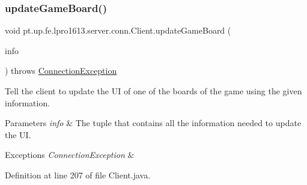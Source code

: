 \subsubsection{\texorpdfstring{update\+Game\+Board()}{updateGameBoard()}}
{\footnotesize\ttfamily void pt.\+up.\+fe.\+lpro1613.\+server.\+conn.\+Client.\+update\+Game\+Board (\begin{DoxyParamCaption}\item[{\hyperlink{classpt_1_1up_1_1fe_1_1lpro1613_1_1sharedlib_1_1structs_1_1_board_u_i_info}{Board\+U\+I\+Info}}]{info }\end{DoxyParamCaption}) throws \hyperlink{classpt_1_1up_1_1fe_1_1lpro1613_1_1sharedlib_1_1exceptions_1_1_connection_exception}{Connection\+Exception}}

Tell the client to update the UI of one of the boards of the game using the given information.


\begin{DoxyParams}{Parameters}
{\em info} & The tuple that contains all the information needed to update the UI. \\
\hline
\end{DoxyParams}

\begin{DoxyExceptions}{Exceptions}
{\em Connection\+Exception} & \\
\hline
\end{DoxyExceptions}


Definition at line 207 of file Client.\+java.

